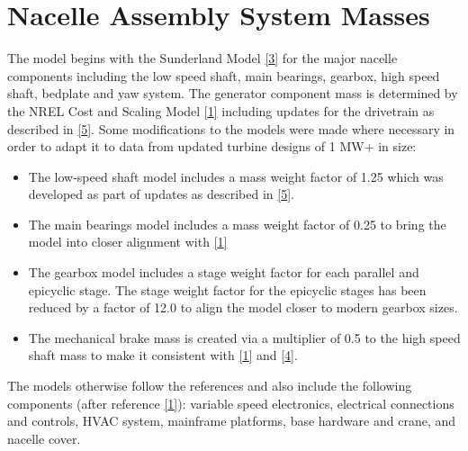 \documentclass[letterpaper,10pt,openany,oneside]{sphinxmanual}
\begin{document}
\section{Nacelle Assembly System Masses}
\label{theory:nacelle-assembly-system-masses}
The model begins with the Sunderland Model {\hyperref[theory:3]{{[}3{]}}} for the major nacelle components including the low speed shaft, main bearings, gearbox, high speed shaft, bedplate and yaw system.  The generator component mass is determined by the NREL Cost and Scaling Model {\hyperref[theory:1]{{[}1{]}}} including updates for the drivetrain as described in {\hyperref[theory:5]{{[}5{]}}}.  Some modifications to the models were made where necessary in order to adapt it to data from updated turbine designs of 1 MW+ in size:
\begin{itemize}
\item {} 
The low-speed shaft model includes a mass weight factor of 1.25 which was developed as part of updates as described in {\hyperref[theory:5]{{[}5{]}}}.

\item {} 
The main bearings model includes a mass weight factor of 0.25 to bring the model into closer alignment with {\hyperref[theory:1]{{[}1{]}}}

\item {} 
The gearbox model includes a stage weight factor for each parallel and epicyclic stage.  The stage weight factor for the epicyclic stages has been reduced by a factor of 12.0 to align the model closer to modern gearbox sizes.

\item {} 
The mechanical brake mass is created via a multiplier of 0.5 to the high speed shaft mass to make it consistent with {\hyperref[theory:1]{{[}1{]}}} and {\hyperref[theory:4]{{[}4{]}}}.

\end{itemize}

The models otherwise follow the references and also include the following components (after reference {\hyperref[theory:1]{{[}1{]}}}): variable speed electronics, electrical connections and controls, HVAC system, mainframe platforms, base hardware and crane, and nacelle cover.
\end{document}
